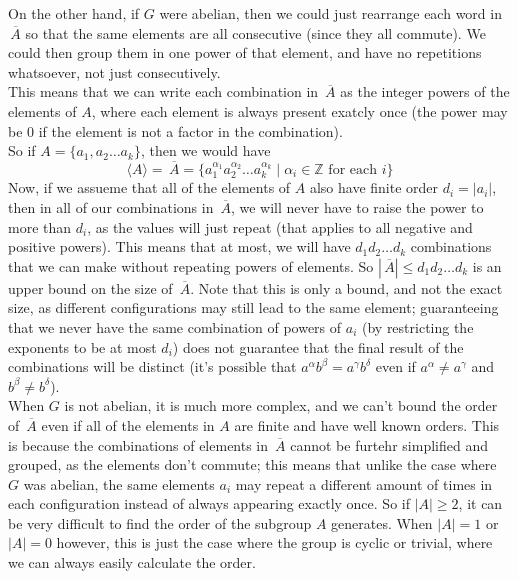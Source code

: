 \documentclass[12pt]{article}
\newcommand{\Z}{\mathbb{Z}}
\newcommand{\olsi}[1]{\,\overline{{#1}}}
\newcommand{\ang}[1]{\langle #1 \rangle}
\begin{document}
    On the other hand, if $G$ were abelian,
    then we could just rearrange each word in $\olsi{A}$
    so that the same elements are all consecutive
    (since they all commute).
    We could then group them in one power of that element,
    and have no repetitions whatsoever,
    not just consecutively. \\
    This means that we can write each combination in $\olsi{A}$
    as the integer powers of the elements of $A$,
    where each element is always present exatcly once
    (the power may be 0
    if the element is not a factor in the combination). \\
    So if $A = \{ a_1, a_2 \dots a_k \}$,
    then we would have
    \[ \ang{A} = \olsi{A} 
    = \{ a_1^{\alpha_1}a_2^{\alpha_2} \dots a_k^{\alpha_k} \mid
    \alpha_i \in \Z \text{ for each } i \} \]
    Now, if we assueme that all of the elements of $A$
    also have finite order $d_i = |a_i|$,
    then in all of our combinations in $\olsi{A}$,
    we will never have to raise the power to more than
    $d_i$,
    as the values will just repeat
    (that applies to all negative and positive powers).
    This means that at most,
    we will have $d_1d_2\dots d_k$ combinations
    that we can make without repeating powers of elements.
    So $|\olsi{A}| \leqslant d_1d_2\dots d_k$
    is an upper bound on the size of $\olsi{A}$.
    Note that this is only a bound, and not the exact size,
    as different configurations may still lead to the same element;
    guaranteeing that we never have the same 
    combination of powers of $a_i$
    (by restricting the exponents to be at most $d_i$)
    does not guarantee that the final result of the combinations
    will be distinct
    (it's possible that $a^\alpha b^\beta = a^\gamma b^\delta$
    even if $a^\alpha \neq a^\gamma$ and  $b^\beta \neq b^\delta$). \\
    When $G$ is not abelian,
    it is much more complex,
    and we can't bound the order of $\olsi{A}$
    even if all of the elements in $A$ are finite and have
    well known orders.
    This is because the combinations of elements in $\olsi{A}$
    cannot be furtehr simplified and grouped,
    as the elements don't commute;
    this means that unlike the case where $G$ was abelian,
    the same elements $a_i$
    may repeat a different amount of times in each configuration
    instead of always appearing exactly once.
    So if $|A| \geqslant 2$,
    it can be very difficult to find the order of
    the subgroup $A$ generates.
    When $|A| = 1$ or $|A| = 0$ however,
    this is just the case where the group is cyclic or trivial,
    where we can always easily calculate the order. \\
\end{document}
